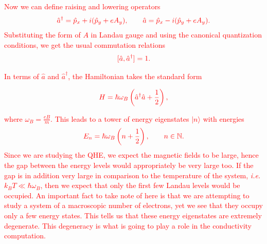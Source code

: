  \textcolor{red}{Now we can define raising and lowering operators }
\begin{align}
    \textcolor{red}{\hat{a}^{\dagger}= \hat{p}_x +i (\hat{p}_y +e A_y), \qquad \hat{a}= \hat{p}_x  -i (\hat{p}_y +e A_y).}
\end{align}
 \textcolor{red}{Substituting the form of $A$ in Landau gauge and using the canonical quantization conditions, we get the usual commutation relations}
\begin{align}
    \textcolor{red}{ [\hat{a}, \hat{a}^{\dagger}] =1.}
\end{align}

 \textcolor{red}{ In terms of $\hat{a}$ and $\hat{a}^{\dagger}$, the Hamiltonian takes the standard form}

\begin{align}
    \textcolor{red}{ H = \hbar \omega_B \left( \hat{a}^{\dagger} \hat{a}+ \frac{1}{2}\right),}
\end{align}

 \textcolor{red}{ where $\omega_B=\frac{eB}{m}$. This leads to a tower of energy eigenstates $|n\rangle$ with energies}
\begin{align}
    \textcolor{red}{ E_n= \hbar \omega_B \left( n + \frac{1}{2} \right), \qquad n \in \mathbb{N}.}
\end{align}
 \textcolor{red}{ Since we are studying the QHE, we expect the magnetic fields to be large, hence the gap between the energy levels would appropriately be very large too. If the gap is in addition very large in comparison to the temperature of the system, \textit{i.e.} $k_B T \ll \hbar \omega_B$, then we expect that only the first few Landau levels would be occupied. An important fact to take note of here is that we are attempting to study a system of a macroscopic number of electrons, yet we see that they occupy only a few energy states. This tells us that these energy eigenstates are extremely degenerate. This degeneracy is what is going to play a role in the conductivity computation.}

